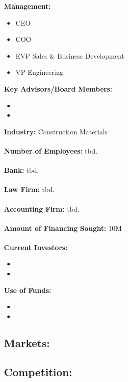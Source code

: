 \newcommand{\mgtext}[1]{\large{\textbf{#1}}}	
\begin{multicols}{2}
	\small
	\begin{minipage}{.48\textwidth}
	\begin{fminipage}{\textwidth}
		\tiny
		\mgtext{Management:}
			\begin{itemize}
				\item CEO
				\item COO
				\item EVP Sales \& Business Development
				\item VP Engineering
			\end{itemize}
		\mgtext{Key Advisors/Board Members:}
			\begin{itemize}
				\item
				\item
			\end{itemize}
		\mgtext{Industry: } Construction Materials\\
		\\\mgtext{Number of Employees:} tbd.\\
		\\\mgtext{Bank:} tbd.\\
		\\\mgtext{Law Firm:} tbd.\\
		\\\mgtext{Accounting Firm:} tbd.\\
		\\\mgtext{Amount of Financing Sought:} \textdollaroldstyle10M\\
		\\\mgtext{Current Investors:}\\
			\begin{itemize}
				\item
				\item
			\end{itemize}
		\mgtext{Use of Funds:}
			\begin{itemize}
				\item
				\item
			\end{itemize}		

	\end{fminipage}	
	\subsection*{Markets:}
	\subsection*{Competition:}

\end{minipage}
\end{multicols}
